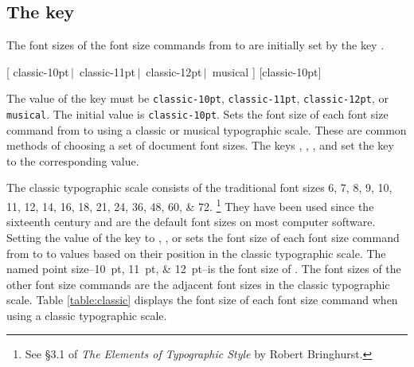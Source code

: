 \documentclass{beery}
\begin{document}
\subsection
  {%
    The key
    \texorpdfstring
      {}
      {typographic-scale}%
  }
\label{subsec:typographicscale}

The font sizes of the font size commands from  to  are initially set by the key .

\begin{mydisplaycode}
    [
      classic-10pt$\,\vert\,$\allowbreak
      classic-11pt$\,\vert\,$\allowbreak
      classic-12pt$\,\vert\,$\allowbreak\hspace*{1.5em}%
      musical
    ]
    [classic-10pt]
  \newline
  \newline
  \newline
  \nopagebreak\newline
\end{mydisplaycode}

The value of the key  must be \texttt{classic-10pt}, \texttt{classic-11pt}, \texttt{classic-12pt}, or \texttt{musical}.
The initial value is \texttt{classic-10pt}.
Sets the font size of each font size command from  to  using a classic or musical typographic scale.
These are common methods of choosing a set of document font sizes.
The keys , , , and  set the key  to the corresponding value.

The classic typographic scale consists of the traditional font sizes
\numlist{6;7;8;9;10;11;12;14;16;18;21;24;36;48;60;72}.%
\footnote{See \S3.1 of \textit{The Elements of Typographic Style} by Robert Bringhurst.}
They have been used since the sixteenth century and are the default font sizes on most computer software.
Setting the value of the key  to , , or  sets the font size of each font size command from  to  to values based on their position in the classic typographic scale.
The named point size\---\qtylist[list-final-separator={, or }]{10;11;12}{pt}\---is the font size of .
The font sizes of the other font size commands are the adjacent font sizes in the classic typographic scale.
Table \ref{table:classic} displays the font size of each font size command when using a classic typographic scale.
\end{document}
